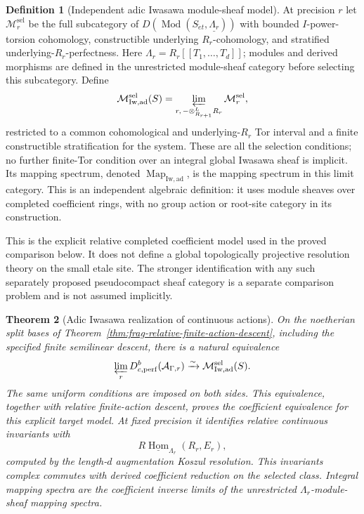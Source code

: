 \documentclass[11pt]{article}
\newtheorem{theorem}{Theorem}[section]
\theoremstyle{definition}
\newtheorem{definition}[theorem]{Definition}
\theoremstyle{remark}
\begin{document}
\begin{definition}[Independent adic Iwasawa module-sheaf model]
\label{def:frag-adic-iwasawa-sheaves}
At precision $r$ let $\mathcal M_{r}^{\mathrm{sel}}$ be the full
subcategory of $D(\operatorname{Mod}(S_{\acute et},\underline{\Lambda_r}))$
with bounded $I$-power-torsion cohomology, constructible underlying
$R_r$-cohomology, and stratified underlying-$R_r$-perfectness.
Here $\Lambda_r=R_r[[T_1,\ldots,T_d]]$; modules and derived morphisms
are defined in the unrestricted module-sheaf category before selecting
this subcategory.  Define
\[
\mathcal M_{\mathrm{Iw,ad}}^{\mathrm{sel}}(S)
 =\varprojlim_{r,\,-\otimes^L_{R_{r+1}}R_r}\mathcal M_r^{\mathrm{sel}},
\]
restricted to a common cohomological and underlying-$R_r$ Tor
interval and a finite constructible stratification for the system.
These are all the selection conditions; no further finite-Tor
condition over an integral global Iwasawa sheaf is implicit.  Its mapping spectrum, denoted
$\operatorname{Map}_{\mathrm{Iw,ad}}$, is the mapping spectrum in this
limit category.  This is an independent algebraic definition: it uses
module sheaves over completed coefficient rings, with no group action
or root-site category in its construction.

This is the explicit relative completed coefficient model used in the
proved comparison below.  It does not define a global topologically
projective resolution theory on the small etale site.  The stronger
identification with any such separately proposed pseudocompact sheaf
category is a separate comparison problem and is not assumed implicitly.
\end{definition}

\begin{theorem}[Adic Iwasawa realization of continuous actions]
\label{thm:frag-F-adic-iwasawa}
On the noetherian split bases of
Theorem~\ref{thm:frag-relative-finite-action-descent}, including the
specified finite semilinear descent, there is a natural equivalence
\[
 \varprojlim_r D^b_{c,\mathrm{perf}}(\mathcal A_{\Gamma,r})
 \xrightarrow{\sim}\mathcal M_{\mathrm{Iw,ad}}^{\mathrm{sel}}(S).
\]
The same uniform conditions are imposed on both sides.  This equivalence,
together with relative finite-action descent, proves the coefficient equivalence for this
explicit target model.  At fixed precision it identifies relative
continuous invariants with
\[
R\underline{\operatorname{Hom}}_{\Lambda_r}(R_r,E_r),
\]
computed by the length-$d$ augmentation Koszul resolution.  This
invariants complex commutes with derived coefficient reduction on the
selected class.  Integral mapping spectra are the coefficient inverse
limits of the unrestricted $\Lambda_r$-module-sheaf mapping spectra.
\end{theorem}
\end{document}

